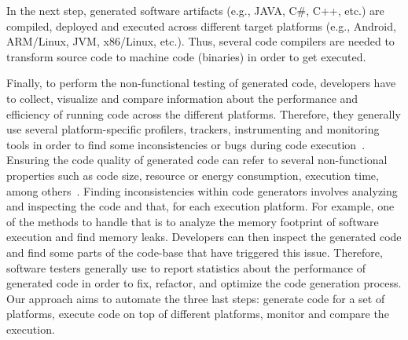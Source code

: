 In the next step, generated software artifacts (e.g., JAVA, C\#, C++, etc.) are compiled, deployed and executed across different target platforms (e.g., Android, ARM/Linux, JVM, x86/Linux, etc.). Thus, several code compilers are needed to transform source code to machine code (binaries) in order to get executed. 

Finally, to perform the non-functional testing of generated code, developers have to collect, visualize and compare information about the performance and efficiency of running code across the different platforms. 
Therefore, they generally use several platform-specific profilers, trackers, instrumenting and monitoring tools in order to find some inconsistencies or bugs during code execution~\cite{guana2014chaintracker,delgado2004taxonomy}. Ensuring the code quality of generated code can refer to several non-functional properties such as code size, resource or energy consumption, execution time, among others~\cite{pan2006fast}. Finding inconsistencies within code generators involves analyzing and inspecting the code and that, for each execution platform. For example, one of the methods to handle that is to analyze the memory footprint of software execution and find memory leaks. Developers can then inspect the generated code and find some parts of the code-base that have triggered this issue. %
Therefore, software testers generally use to report statistics about the performance of generated code in order to fix, refactor, and optimize the code generation process. Our approach aims to automate the three last steps: generate code for a set of platforms, execute code on top of different platforms, monitor and compare the execution. 

